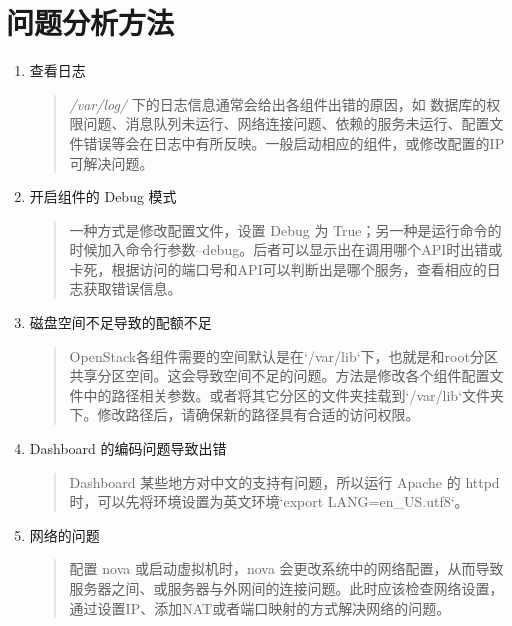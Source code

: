 \documentclass[a4paper,12pt,english]{sphinxmanual}
\begin{document}
\chapter{问题分析方法}
\label{problems::doc}\label{problems:id1}\begin{enumerate}
\item {} 
查看日志
\begin{quote}

\emph{/var/log/} 下的日志信息通常会给出各组件出错的原因，如 数据库的权限问题、消息队列未运行、网络连接问题、依赖的服务未运行、配置文件错误等会在日志中有所反映。一般启动相应的组件，或修改配置的IP可解决问题。
\end{quote}

\item {} 
开启组件的 Debug 模式
\begin{quote}

一种方式是修改配置文件，设置 Debug 为 True；另一种是运行命令的时候加入命令行参数--debug。后者可以显示出在调用哪个API时出错或卡死，根据访问的端口号和API可以判断出是哪个服务，查看相应的日志获取错误信息。
\end{quote}

\item {} 
磁盘空间不足导致的配额不足
\begin{quote}

OpenStack各组件需要的空间默认是在{}`/var/lib{}`下，也就是和root分区共享分区空间。这会导致空间不足的问题。方法是修改各个组件配置文件中的路径相关参数。或者将其它分区的文件夹挂载到{}`/var/lib{}`文件夹下。修改路径后，请确保新的路径具有合适的访问权限。
\end{quote}

\item {} 
Dashboard 的编码问题导致出错
\begin{quote}

Dashboard 某些地方对中文的支持有问题，所以运行 Apache 的 httpd 时，可以先将环境设置为英文环境{}`export LANG=en\_US.utf8{}`。
\end{quote}

\item {} 
网络的问题
\begin{quote}

配置 nova 或启动虚拟机时，nova 会更改系统中的网络配置，从而导致服务器之间、或服务器与外网间的连接问题。此时应该检查网络设置，通过设置IP、添加NAT或者端口映射的方式解决网络的问题。
\end{quote}

\end{enumerate}



\renewcommand{\indexname}{Index}
\printindex
\end{document}
